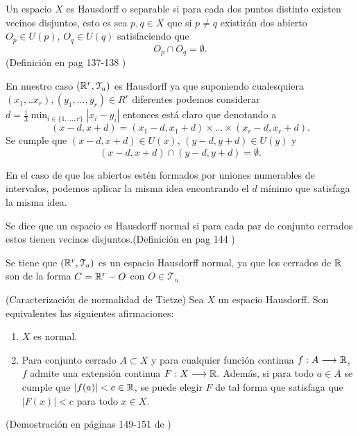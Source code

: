 \begin{definicion}[Hausdorff]
    Un espacio $X$ es Hausdorff o separable si para cada dos puntos distinto existen vecinos disjuntos, esto es 
    sea $p,q \in X$ que  si $p \neq q$ existirán dos abierto $O_p \in U(p)$, $O_q \in U(q)$ satisfaciendo que 
    \begin{equation}
        O_p \cap O_q = \emptyset.
    \end{equation}
    (Definición en pag 137-138 \cite{james1966topology})

    En nuestro caso $(\mathbb{R}^r, \mathcal{T}_u)$ es Hausdorff ya 
    que suponiendo cualesquiera 
    $(x_1,..x_r),(y_1, ..., y_r) \in R^r$ diferentes
    podemos considerar $d = \frac{1}{3}\min_{i\in \{1,...,r\}}|x_i-y_i|$ entonces está claro que 
    denotando a 
    \begin{equation}
        (x-d, x+d) = (x_1-d, x_1+d) \times ...  \times (x_r-d, x_r+d).
    \end{equation}
    Se cumple que 
    $(x-d, x+d) \in U(x)$,
    $(y-d, y+d) \in U(y)$  y 
    \begin{equation}
        (x-d, x+d) \cap (y-d, y+d) = \emptyset.
    \end{equation}

    En el caso de que los abiertos estén formados por uniones numerables de intervalos, 
    podemos aplicar la misma idea encontrando el $d$ mínimo que satisfaga la misma idea.
\end{definicion}

\begin{definicion}
    Se dice que un espacio es Hausdorff normal si para cada par de conjunto cerrados  
    estos tienen vecinos disjuntos.(Definición en pag 144 \cite{james1966topology})

    Se tiene que $(\mathbb{R}^r, \mathcal{T}_u)$ es un espacio Hausdorff normal, ya que los cerrados de $\mathbb{R}$
    son de la forma $C = \mathbb{R}^r - O$ con $O \in \mathcal{T}_u$ 
\end{definicion}

\begin{teorema}(Caracterización de normalidad de Tietze)
    Sea $X$ un espacio Hausdorff. Son equivalentes las siguientes afirmaciones: 
    \begin{enumerate}
        \item $X$ es normal.
        \item Para conjunto cerrado $A \subset X$ y para cualquier función continua 
        $f: A \longrightarrow \mathbb{R}$, $f$ admite una extensión continua $F:X \longrightarrow \mathbb{R}.$
        Además, si para todo $a \in A$ se cumple que $|f(a)| < c \in \mathbb{R}$, se puede elegir $F$
        de tal forma que satisfaga que $|F(x)| < c$ para todo $x\in X.$ 
    \end{enumerate}
    (Demostración en páginas 149-151 de \cite{james1966topology})
\end{teorema}

